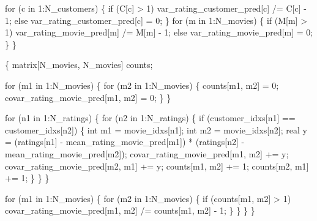 \documentclass[
  letterpaper,
  DIV=11,
  numbers=noendperiod]{scrartcl}
\newenvironment{Shaded}{\begin{snugshade}}{\end{snugshade}}
\newcommand{\ControlFlowTok}[1]{\textcolor[rgb]{0.00,0.23,0.31}{#1}}
\newcommand{\DataTypeTok}[1]{\textcolor[rgb]{0.68,0.00,0.00}{#1}}
\newcommand{\DecValTok}[1]{\textcolor[rgb]{0.68,0.00,0.00}{#1}}
\newcommand{\NormalTok}[1]{\textcolor[rgb]{0.00,0.23,0.31}{#1}}
\begin{document}
\begin{codelisting}
\begin{Shaded}
\begin{Highlighting}[]
    \ControlFlowTok{for}\NormalTok{ (c }\ControlFlowTok{in} \DecValTok{1}\NormalTok{:N\_customers) \{}
      \ControlFlowTok{if}\NormalTok{ (C[c] \textgreater{} }\DecValTok{1}\NormalTok{)}
\NormalTok{        var\_rating\_customer\_pred[c] /= C[c] {-} }\DecValTok{1}\NormalTok{;}
      \ControlFlowTok{else}
\NormalTok{        var\_rating\_customer\_pred[c] = }\DecValTok{0}\NormalTok{;}
\NormalTok{    \}}
    \ControlFlowTok{for}\NormalTok{ (m }\ControlFlowTok{in} \DecValTok{1}\NormalTok{:N\_movies) \{}
      \ControlFlowTok{if}\NormalTok{ (M[m] \textgreater{} }\DecValTok{1}\NormalTok{)}
\NormalTok{        var\_rating\_movie\_pred[m] /= M[m] {-} }\DecValTok{1}\NormalTok{;}
      \ControlFlowTok{else}
\NormalTok{        var\_rating\_movie\_pred[m] = }\DecValTok{0}\NormalTok{;}
\NormalTok{    \}}
\NormalTok{  \}}

\NormalTok{  \{}
    \DataTypeTok{matrix}\NormalTok{[N\_movies, N\_movies] counts;}

    \ControlFlowTok{for}\NormalTok{ (m1 }\ControlFlowTok{in} \DecValTok{1}\NormalTok{:N\_movies) \{}
      \ControlFlowTok{for}\NormalTok{ (m2 }\ControlFlowTok{in} \DecValTok{1}\NormalTok{:N\_movies) \{}
\NormalTok{        counts[m1, m2] = }\DecValTok{0}\NormalTok{;}
\NormalTok{        covar\_rating\_movie\_pred[m1, m2] = }\DecValTok{0}\NormalTok{;}
\NormalTok{      \}}
\NormalTok{    \}}

    \ControlFlowTok{for}\NormalTok{ (n1 }\ControlFlowTok{in} \DecValTok{1}\NormalTok{:N\_ratings) \{}
      \ControlFlowTok{for}\NormalTok{ (n2 }\ControlFlowTok{in} \DecValTok{1}\NormalTok{:N\_ratings) \{}
        \ControlFlowTok{if}\NormalTok{ (customer\_idxs[n1] == customer\_idxs[n2]) \{}
          \DataTypeTok{int}\NormalTok{ m1 = movie\_idxs[n1];}
          \DataTypeTok{int}\NormalTok{ m2 = movie\_idxs[n2];}
          \DataTypeTok{real}\NormalTok{ y =   (ratings[n1] {-} mean\_rating\_movie\_pred[m1])}
\NormalTok{                   * (ratings[n2] {-} mean\_rating\_movie\_pred[m2]);}
\NormalTok{          covar\_rating\_movie\_pred[m1, m2] += y;}
\NormalTok{          covar\_rating\_movie\_pred[m2, m1] += y;}
\NormalTok{          counts[m1, m2] += }\DecValTok{1}\NormalTok{;}
\NormalTok{          counts[m2, m1] += }\DecValTok{1}\NormalTok{;}
\NormalTok{        \}}
\NormalTok{      \}}
\NormalTok{    \}}

    \ControlFlowTok{for}\NormalTok{ (m1 }\ControlFlowTok{in} \DecValTok{1}\NormalTok{:N\_movies) \{}
      \ControlFlowTok{for}\NormalTok{ (m2 }\ControlFlowTok{in} \DecValTok{1}\NormalTok{:N\_movies) \{}
        \ControlFlowTok{if}\NormalTok{ (counts[m1, m2] \textgreater{} }\DecValTok{1}\NormalTok{)}
\NormalTok{          covar\_rating\_movie\_pred[m1, m2] /= counts[m1, m2] {-} }\DecValTok{1}\NormalTok{;}
\NormalTok{      \}}
\NormalTok{    \}}
\NormalTok{  \}}
\NormalTok{\}}
\end{Highlighting}
\end{Shaded}

\end{codelisting}
\end{document}

